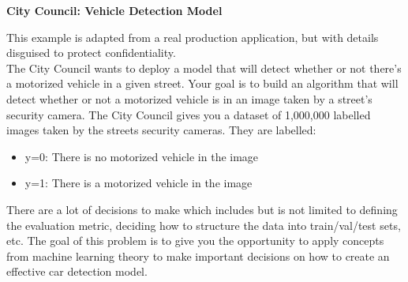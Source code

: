 \item {\bf City Council: Vehicle Detection Model}

This example is adapted from a real production application, but with details disguised to protect confidentiality.\\

The City Council wants to deploy a model that will detect whether or not there’s a motorized vehicle in a given street. Your goal is to build an algorithm that will detect whether or not a motorized vehicle is in an image taken by a street’s security camera. The City Council gives you a dataset of 1,000,000 labelled images taken by the streets security cameras. They are labelled:	
\begin{itemize}
    \item y=0: There is no motorized vehicle in the image
    \item y=1: There is a motorized vehicle in the image	
\end{itemize}

There are a lot of decisions to make which includes but is not limited to defining the evaluation metric, deciding how to structure the data into train/val/test sets, etc. The goal of this problem is to give you the opportunity to apply concepts from machine learning theory to make important decisions on how to create an effective car detection model.

\begin{enumerate}
    
    

    
    

    
    

    
    

    
    

    
    

    
    

    
    

    
    

    
    

\end{enumerate}
